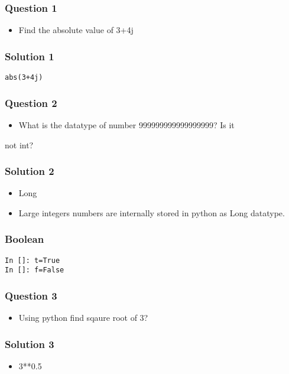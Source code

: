 \documentclass[presentation]{beamer}
\begin{document}
\begin{frame}
\frametitle{Question 1}
\label{sec-3}

\begin{itemize}
\item Find the absolute value of 3+4j
\end{itemize}
\end{frame}
\begin{frame}[fragile]
\frametitle{Solution 1}
\label{sec-4}

\begin{verbatim}
abs(3+4j)
\end{verbatim}
\end{frame}
\begin{frame}
\frametitle{Question 2}
\label{sec-5}

\begin{itemize}
\item What is the datatype of number 999999999999999999? Is it
\end{itemize}

not int?
\end{frame}
\begin{frame}
\frametitle{Solution 2}
\label{sec-6}

\begin{itemize}
\item Long
\item Large integers numbers are internally stored in python as Long
    datatype.
\end{itemize}
\end{frame}
\begin{frame}[fragile]
\frametitle{Boolean}
\label{sec-7}

\begin{verbatim}
In []: t=True
In []: f=False
\end{verbatim}
\end{frame}
\begin{frame}
\frametitle{Question 3}
\label{sec-8}

\begin{itemize}
\item Using python find sqaure root of 3?
\end{itemize}
\end{frame}
\begin{frame}
\frametitle{Solution 3}
\label{sec-9}


\begin{itemize}
\item 3**0.5
\end{itemize}
\end{frame}
\end{document}
